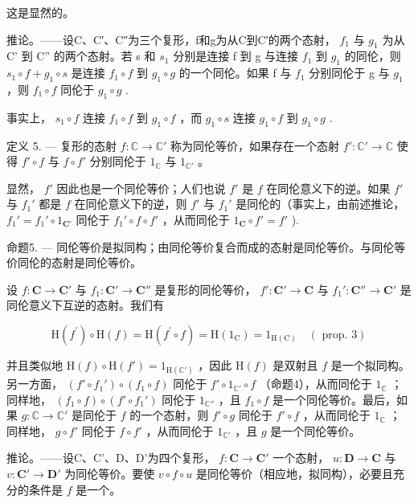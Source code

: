 这是显然的。

推论。——设C、C′、C″为三个复形，f和g为从C到C′的两个态射， \(f_{1}\) 与 \(g_{1}\) 为从 C' 到 C'' 的两个态射。若 s 和 \(s_{1}\) 分别是连接 f 到 g 与连接 \(f_{1}\) 到 \(g_{1}\) 的同伦，则 \(s_{1} \circ f + g_{1} \circ s\) 是连接 \(f_{1} \circ f\) 到 \(g_{1} \circ g\) 的一个同伦。如果 f 与 \(f_{1}\) 分别同伦于 g 与 \(g_{1}\) ，则 \(f_{1} \circ f\) 同伦于 \(g_{1} \circ g\) .

事实上， \(s_{1} \circ f\) 连接 \(f_{1} \circ f\) 到 \(g_{1} \circ f\) ，而 \(g_{1} \circ s\) 连接 \(g_{1} \circ f\) 到 \(g_{1} \circ g\) .

定义 5. --- 复形的态射 \(f: \mathbb{C} \to \mathbb{C}'\) 称为同伦等价，如果存在一个态射 \(f': \mathbb{C}' \to \mathbb{C}\) 使得 \(f' \circ f\) 与 \(f \circ f'\) 分别同伦于 \(1_{\mathbb{C}}\) 与 \(1_{\mathbb{C}'}\) 。

显然， \(f'\) 因此也是一个同伦等价；人们也说 \(f'\) 是 \(f\) 在同伦意义下的逆。如果 \(f'\) 与 \(f_1'\) 都是 \(f\) 在同伦意义下的逆，则 \(f'\) 与 \(f_1'\) 是同伦的（事实上，由前述推论， \(f_1' = f_1' \circ 1_{\mathbf{C}'}\) 同伦于 \(f_1' \circ f \circ f'\) ，从而同伦于 \(1_{\mathbf{C}} \circ f' = f'\) ).

命题5. — 同伦等价是拟同构；由同伦等价复合而成的态射是同伦等价。与同伦等价同伦的态射是同伦等价。

设 \(f: \mathbf{C} \to \mathbf{C}'\) 与 \(f_1: \mathbf{C}' \to \mathbf{C}''\) 是复形的同伦等价， \(f': \mathbf{C}' \to \mathbf{C}\) 与 \(f_1': \mathbf{C}'' \to \mathbf{C}'\) 是同伦意义下互逆的态射。我们有

\[
\mathrm{H} (f ^ {\prime}) \circ \mathrm{H} (f) = \mathrm{H} (f ^ {\prime} \circ f) = \mathrm{H} (1 _ {\mathrm{C}}) = 1 _ {\mathrm{H(C)}} \quad (\text { prop. } 3)
\]

并且类似地 \(\mathrm{H}(f) \circ \mathrm{H}(f') = 1_{\mathrm{H}(\mathbb{C}')}\) ，因此 \(\mathrm{H}(f)\) 是双射且 \(f\) 是一个拟同构。另一方面， \((f' \circ f_1') \circ (f_1 \circ f)\) 同伦于 \(f' \circ 1_{\mathbb{C}'} \circ f\) （命题4），从而同伦于 \(1_{\mathbb{C}}\) ；同样地， \((f_1 \circ f) \circ (f' \circ f_1')\) 同伦于 \(1_{\mathbb{C}''}\) ，且 \(f_1 \circ f\) 是一个同伦等价。最后，如果 \(g: \mathbb{C} \to \mathbb{C}'\) 是同伦于 \(f\) 的一个态射，则 \(f' \circ g\) 同伦于 \(f' \circ f\) ，从而同伦于 \(1_{\mathbb{C}}\) ；同样地， \(g \circ f'\) 同伦于 \(f \circ f'\) ，从而同伦于 \(1_{\mathbb{C}'}\) ，且 \(g\) 是一个同伦等价。

推论。——设C、C'、D、D'为四个复形， \(f: \mathbf{C} \to \mathbf{C}'\) 一个态射， \(u: \mathbf{D} \to \mathbf{C}\) 与 \(v: \mathbf{C}' \to \mathbf{D}'\) 为同伦等价。要使 \(v \circ f \circ u\) 是同伦等价（相应地，拟同构），必要且充分的条件是 \(f\) 是一个。

